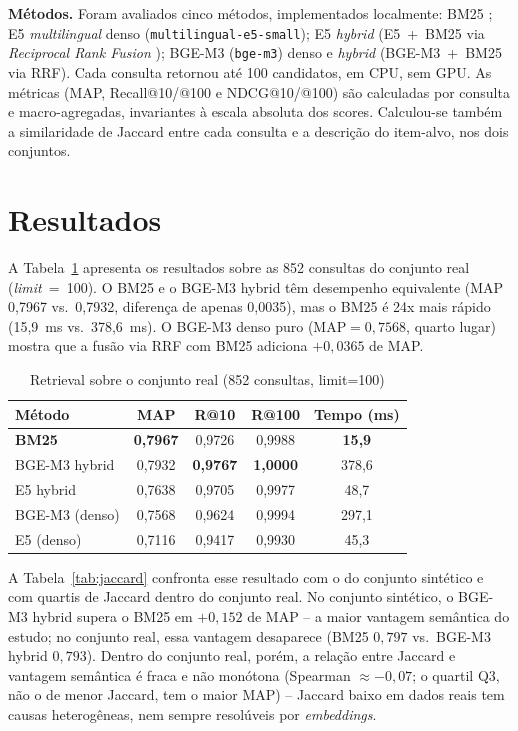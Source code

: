 \documentclass[12pt]{article}
\begin{document}
\textbf{M\'etodos.} Foram avaliados cinco m\'etodos, implementados localmente: BM25 \cite{robertson:09}; E5 \emph{multilingual} denso \cite{wang:22} (\texttt{multilingual-e5-small}); E5 \emph{hybrid} (E5~+~BM25 via \emph{Reciprocal Rank Fusion} \cite{cormack:09}); BGE-M3 \cite{chen:24} (\texttt{bge-m3}) denso e \emph{hybrid} (BGE-M3~+~BM25 via RRF). Cada consulta retornou at\'e 100 candidatos, em CPU, sem GPU. As m\'etricas (MAP, Recall@10/@100 e NDCG@10/@100) s\~ao calculadas por consulta e macro-agregadas, invariantes \`a escala absoluta dos scores. Calculou-se tamb\'em a similaridade de Jaccard entre cada consulta e a descri\c{c}\~ao do item-alvo, nos dois conjuntos.

\section{Resultados}

A Tabela~\ref{tab:resultados} apresenta os resultados sobre as 852 consultas do conjunto real (\emph{limit}~=~100). O BM25 e o BGE-M3 hybrid t\^em desempenho equivalente (MAP 0,7967 vs.\ 0,7932, diferen\c{c}a de apenas 0,0035), mas o BM25 \'e 24x mais r\'apido (15,9~ms vs.\ 378,6~ms). O BGE-M3 denso puro (MAP$=0{,}7568$, quarto lugar) mostra que a fus\~ao via RRF com BM25 adiciona $+0{,}0365$ de MAP.

\begin{table}[ht]
\centering
\small
\caption{Retrieval sobre o conjunto real (852 consultas, limit=100)}
\label{tab:resultados}
\begin{tabular}{|l|c|c|c|c|}
\hline
\textbf{M\'etodo} & \textbf{MAP} & \textbf{R@10} & \textbf{R@100} & \textbf{Tempo (ms)} \\
\hline
\textbf{BM25} & \textbf{0,7967} & 0,9726 & 0,9988 & \textbf{15,9} \\
\hline
BGE-M3 hybrid & 0,7932 & \textbf{0,9767} & \textbf{1,0000} & 378,6 \\
\hline
E5 hybrid & 0,7638 & 0,9705 & 0,9977 & 48,7 \\
\hline
BGE-M3 (denso) & 0,7568 & 0,9624 & 0,9994 & 297,1 \\
\hline
E5 (denso) & 0,7116 & 0,9417 & 0,9930 & 45,3 \\
\hline
\end{tabular}
\end{table}

A Tabela~\ref{tab:jaccard} confronta esse resultado com o do conjunto sint\'etico e com quartis de Jaccard dentro do conjunto real. No conjunto sint\'etico, o BGE-M3 hybrid supera o BM25 em $+0{,}152$ de MAP -- a maior vantagem sem\^antica do estudo; no conjunto real, essa vantagem desaparece (BM25 $0{,}797$ vs.\ BGE-M3 hybrid $0{,}793$). Dentro do conjunto real, por\'em, a rela\c{c}\~ao entre Jaccard e vantagem sem\^antica \'e fraca e n\~ao mon\'otona (Spearman $\approx-0{,}07$; o quartil Q3, n\~ao o de menor Jaccard, tem o maior MAP) -- Jaccard baixo em dados reais tem causas heterog\^eneas, nem sempre resol\'uveis por \emph{embeddings}.
\end{document}
